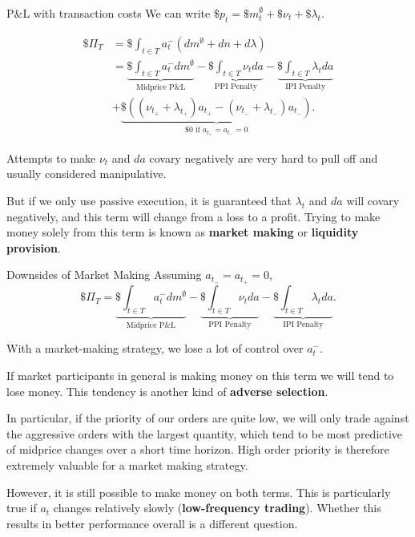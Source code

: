 \documentclass{beamer}
\begin{document}
\begin{frame}{P\&L with transaction costs}
	We can write $\$p_t = \$m_t^\emptyset + \$\nu_t + \$\lambda_t.$

	\begin{align*}
		\$\Pi_T	&= \$\int_{t\in T} a_t^- (dm^\emptyset+dn+d\lambda)
	\\		&= \underbrace{\$\int_{t\in T} a_t^- dm^\emptyset}_{\textrm{Midprice P\&L}} - \underbrace{\$\int_{t\in T} \nu_t da}_{\textrm{PPI Penalty}} - \underbrace{\$\int_{t\in T} \lambda_t da}_{\textrm{IPI Penalty}}
	\\		& + \underbrace{\$((\nu_{t_+} + \lambda_{t_+})a_{t_+} - (\nu_{t_-} + \lambda_{t_-})a_{t_-})}_{\$0\textrm{ if }a_{t_+}=a_{t_-}=0}.
	\end{align*}

	Attempts to make $\nu_t$ and $da$ covary negatively are very hard to pull off and usually considered manipulative.%

	But if we only use passive execution, it is guaranteed that $\lambda_t$ and $da$ will covary negatively, and this term will change from a loss to a profit. Trying to make money solely from this term is known as \textbf{market making} or \textbf{liquidity provision}.
\end{frame}

\begin{frame}{Downsides of Market Making}
	Assuming $a_{t_-}=a_{t_+}=0$,
	$$\$\Pi_T = \underbrace{\$\int_{t\in T} a_t^- dm^\emptyset}_{\textrm{Midprice P\&L}} - \underbrace{\$\int_{t\in T} \nu_t da}_{\textrm{PPI Penalty}} - \underbrace{\$\int_{t\in T} \lambda_t da}_{\textrm{IPI Penalty}}.$$

	With a market-making strategy, we lose a lot of control over $a_t^-$.

	If market participants in general is making money on this term we will tend to lose money. This tendency is another kind of \textbf{adverse selection}.

	In particular, if the priority of our orders are quite low, we will only trade against the aggressive orders with the largest quantity, which tend to be most predictive of midprice changes over a short time horizon. High order priority is therefore extremely valuable for a market making strategy.

	However, it is still possible to make money on both terms. This is particularly true if $a_t$ changes relatively slowly (\textbf{low-frequency trading}). Whether this results in better performance overall is a different question.
\end{frame}
\end{document}
